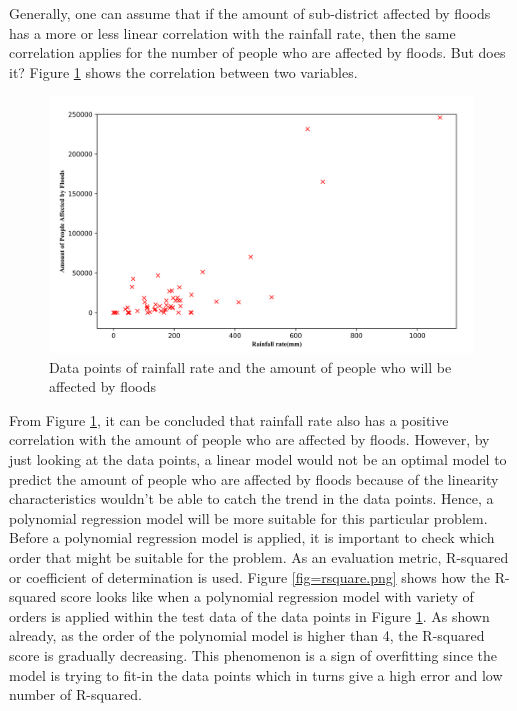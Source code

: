 \noindent
Generally, one can assume that if the amount of sub-district affected by floods has a more or less linear correlation with the rainfall rate, then the same correlation applies for the number of people who are affected by floods. But does it? Figure \ref{fig=corrrainpeop.png} shows the correlation between two variables.\\

\begin{figure}
\begin{center}
\graphicspath{ {./Pict/} }
\includegraphics[scale=0.15]{corrrainpeop.png}
\caption{Data points of rainfall rate and the amount of people who will be affected by floods}\label{fig=corrrainpeop.png}
\end{center}
\end{figure}

\noindent
From Figure \ref{fig=corrrainpeop.png}, it can be concluded that rainfall rate also has a positive correlation with the amount of people who are affected by floods. However, by just looking at the data points, a linear model would not be an optimal model to predict the amount of people who are affected by floods because of the linearity characteristics wouldn't be able to catch the trend in the data points. Hence, a polynomial regression model will be more suitable for this particular problem.\\

\noindent
Before a polynomial regression model is applied, it is important to check which order that might be suitable for the problem. As an evaluation metric, R-squared or coefficient of determination is used. Figure \ref{fig=rsquare.png} shows how the R-squared score looks like when a polynomial regression model with variety of orders is applied within the test data of the data points in Figure \ref{fig=corrrainpeop.png}. As shown already, as the order of the polynomial model is higher than 4, the R-squared score is gradually decreasing. This phenomenon is a sign of overfitting since the model is trying to fit-in the data points which in turns give a high error and low number of R-squared.\\

